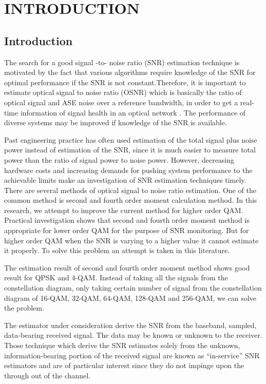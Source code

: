 \documentclass[12pt]{report}
\begin{document}
	\chapter{INTRODUCTION}
	\section{Introduction}
	The search for a good signal -to- noise ratio (SNR) estimation technique is motivated by the fact that various algorithms require knowledge of the SNR for optimal performance if the SNR is not constant.Therefore, it is important to estimate optical signal to noise ratio (OSNR) which is basically the ratio of optical signal and ASE noise over a reference bandwidth, in order to get a real-time information of signal health in an optical network \cite{OPMTech}. The performance of diverse systems may be improved if knowledge of the SNR is available. 
	
	Past engineering practice has often used estimation of the total signal plus noise power instead of estimation of the SNR, since it is much easier to measure total power than the ratio of signal power to noise power. However, decreasing hardware costs and increasing demands for pushing system performance to the achievable limits make an investigation of SNR estimation techniques timely. 
	There are several methods of optical signal to noise ratio estimation. One of the common method is second and fourth order moment calculation method. In this research, we attempt to improve the current method for higher order QAM. Practical investigation shows that second and fourth order moment method is appropriate for lower order QAM for the purpose of SNR monitoring. But for higher order QAM when the SNR is varying to a higher value it cannot estimate it properly. To solve this problem an attempt is taken in this literature.

	The estimation result of second and fourth order moment method shows good result for QPSK and 4-QAM. Instead of taking all the signals from the constellation diagram, only taking certain number of signal from the constellation diagram of 16-QAM, 32-QAM, 64-QAM, 128-QAM and 256-QAM, we can solve the problem. 
	
	The estimator under consideration derive the SNR from the baseband, sampled, data-bearing received signal. The data may be known or unknown to the receiver. Those technique which derive the SNR estimates solely from the unknown, information-bearing portion of the received signal are known as “in-service” SNR estimators and are of particular interest since they do not impinge upon the through out of the channel.
\end{document}

